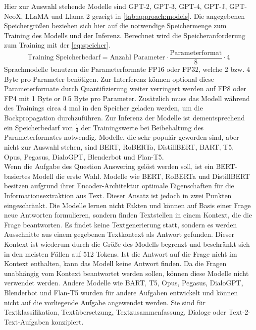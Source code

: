 Hier zur Auswahl stehende Modelle sind GPT-2, GPT-3, GPT-4, GPT-J, GPT-NeoX, LLaMA und Llama 2 gezeigt in \cref{tab:approach:models}.
Die angegebenen Speichergrößen beziehen sich hier auf die notwendige Speichermenge zum Training des Modells und der Inferenz.
Berechnet wird die Speicheranforderung zum Training mit der \cref{eq:speicher}.
\begin{equation}\label{eq:speicher}
    \text{Training Speicherbedarf}=\text{Anzahl Parameter} \cdot \frac{\text{Parameterformat}}{8} \cdot 4
\end{equation}
Sprachmodelle benutzen die Parameterformate FP16 oder FP32, welche 2 bzw. 4 Byte pro Parameter benötigen.
Zur Interferenz können optional diese Parameterformate durch Quantifizierung weiter verringert werden auf FP8 oder FP4 mit 1 Byte or \num{0.5} Byte pro Parameter.
Zusätzlich muss das Modell während des Trainings circa 4 mal in den Speicher geladen werden, um die Backpropagation durchzuführen.
Zur Inferenz der Modelle ist dementsprechend ein Speicherbedarf von $\frac{1}{4}$ der Trainingswerte bei Beibehaltung des Parameterformates notwendig.
Modelle, die sehr populär geworden sind, aber nicht zur Auswahl stehen, sind BERT, RoBERTa, DistillBERT, BART, T5, Opus, Pegasus, DialoGPT, Blenderbot und Flan-T5.\\

Wenn die Aufgabe des Question Answering gelöst werden soll, ist ein BERT-basiertes Modell die erste Wahl.
Modelle wie BERT, RoBERTa und DistillBERT besitzen aufgrund ihrer Encoder-Architektur optimale Eigenschaften für die Informationsextraktion aus Text.
Dieser Ansatz ist jedoch in zwei Punkten eingeschränkt.
Die Modelle lernen nicht Fakten und können auf Basis einer Frage neue Antworten formulieren, sondern finden Textstellen in einem Kontext, die die Frage beantworten.
Es findet keine Textgenerierung statt, sondern es werden Ausschnitte aus einem gegebenen Textkontext als Antwort gefunden.
Dieser Kontext ist wiederum durch die Größe des Modells begrenzt und beschränkt sich in den meisten Fällen auf 512 Tokens.
Ist die Antwort auf die Frage nicht im Kontext enthalten, kann das Modell keine Antwort finden.
Da die Fragen unabhängig vom Kontext beantwortet werden sollen, können diese Modelle nicht verwendet werden.
Andere Modelle wie BART, T5, Opus, Pegasus, DialoGPT, Blenderbot und Flan-T5 wurden für andere Aufgaben entwickelt und können nicht auf die vorliegende Aufgabe angewendet werden.
Sie sind für Textklassifikation, Textübersetzung, Textzusammenfassung, Dialoge oder Text-2-Text-Aufgaben konzipiert.\\

